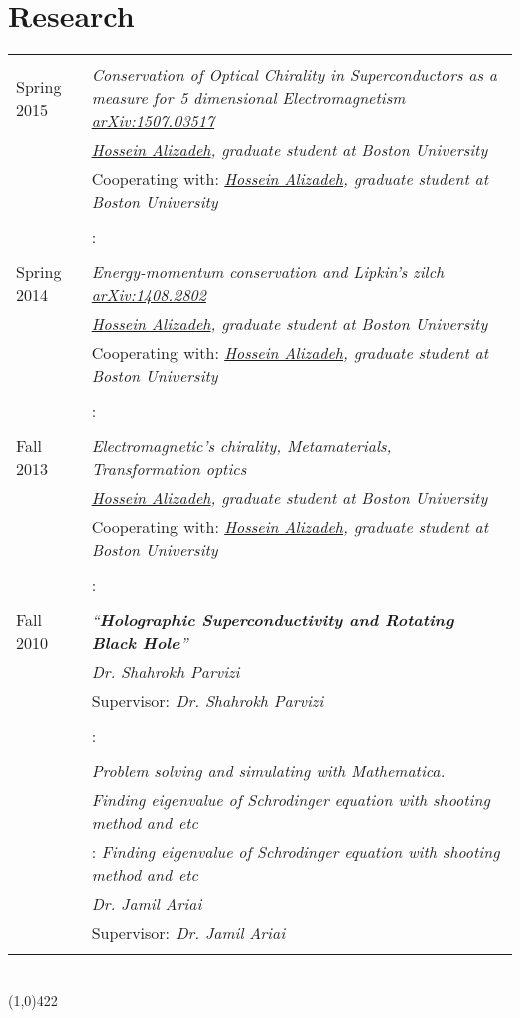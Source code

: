 \documentclass[10pt]{article}
\newcommand\HRule{\hspace*{.8cm}\line(1,0){422}\\}
\newenvironment{Record}[1]
{
    \vspace{-0.5cm}
    \section*{#1}
        \vspace{0.1cm}
        \begin{tabular}
}
{
        \end{tabular}\\
        \HRule
}
\begin{document}

\newcommand{\Research}[7]{
    \multicolumn{2}{l}{\copperplatefont{\textbf{\textsl{ #1:}}}}\\
    \quad#2&\scriptsize\textit{#3}\\
    \ifthenelse{\isempty{#4}}
    {&\scriptsize\textit{#5}\\}
    {&\scriptsize#4: \textit{#5}\\}
    \ifthenelse{\isempty{#6}}
    {&\scriptsize\textit{#7}\\}
    {&\scriptsize#6: \textit{#7}\\}%
}

\begin{Record}{Research}{l p{11cm}}
    \Research{Publication}
        {Spring 2015}
        {Conservation of Optical Chirality in Superconductors as a measure for 5 dimensional Electromagnetism \href{http://arxiv.org/abs/1507.03517}{arXiv:1507.03517}}
        {Cooperating with}
        {\href{http://physics.bu.edu/people/show/halizade}{Hossein Alizadeh}, graduate student at Boston University}
        {}{}%
    \Research{Publication}
        {Spring 2014}
        {Energy-momentum conservation and Lipkin’s zilch \href{http://arxiv.org/abs/1408.2802}{arXiv:1408.2802}}
        {Cooperating with}
        {\href{http://physics.bu.edu/people/show/halizade}{Hossein Alizadeh}, graduate student at Boston University}
        {}{}%
    \Research{Independent Research}
        {Fall 2013}
        {Electromagnetic's chirality, Metamaterials, Transformation optics}
        {Cooperating with}
        {\href{http://physics.bu.edu/people/show/halizade}{Hossein Alizadeh}, graduate student at Boston University}
        {}{}%
    \Research{M.Sc thesis}
        {Fall 2010}
        {``\textbf{Holographic Superconductivity and Rotating Black Hole}''}
        {Supervisor}
        {Dr. Shahrokh Parvizi}
        {}{}%
    \Research{B.Sc projects}
        {}
        {Problem solving and simulating with Mathematica.}
        {}
        {Finding eigenvalue of Schrodinger equation with shooting method and etc}
        {Supervisor}
        {Dr. Jamil Ariai}%

\end{Record}

\end{document}
